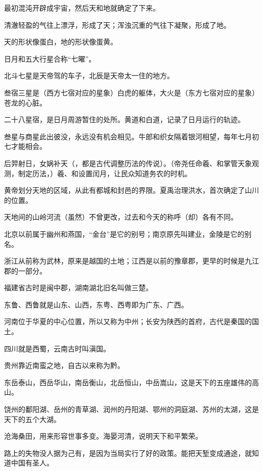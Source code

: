 \documentclass[12pt,UTF-8,openany]{ctexbook}
\begin{document}
\begin{normalsize}
    
    最初混沌开辟成宇宙，然后天和地就确定了下来。
    
    清澈轻盈的气往上漂浮，形成了天；浑浊沉重的气往下凝聚，形成了地。
    
    天的形状像蛋白，地的形状像蛋黄。
    
    日月和五大行星合称“七曜”。
    
    北斗七星是天帝驾的车子，北辰是天帝太一住的地方。
    
    叁宿三星是（西方七宿对应的星象）白虎的躯体，大火是（东方七宿对应的星象）苍龙的心脏。
    
    二十八星宿，是日月周游暂住的处所。黄道和白道，记录了日月运行的轨迹。
    
    叁星与商星此出彼没，永远没有机会相见。牛郎和织女隔着银河相望，每年七月初七才能相会。
    
    后羿射日，女娲补天（，都是古代调整历法的传说）。（帝尧任命羲、和掌管天象观测，制定历法，）羲、和设置闰月，让民众知道务农的时机。
    
    黄帝划分天地的区域，从此有都城和封邑的界限。夏禹治理洪水，首次确定了山川的位置。
    
    天地间的山岭河流（虽然）不曾更改，过去和今天的称呼（却）各有不同。
    
    北京以前属于幽州和燕国，“金台”是它的别号；南京原先叫建业，金陵是它的别名。
    
    浙江从前称为武林，原来是越国的土地；江西是以前的豫章郡，更早的时候是九江郡的一部分。
    
    福建省古时是闽中郡，湖南湖北旧名叫做三楚。
    
    东鲁、西鲁就是山东、山西，东粤、西粤即为广东、广西。
    
    河南位于华夏的中心位置，所以又称为中州；长安为陕西的首府，古代是秦国的国土。
    
    四川就是西蜀，云南古时叫滇国。
    
    贵州靠近南蛮之地，自古以来称为黔。
    
    东岳泰山，西岳华山，南岳衡山，北岳恒山，中岳嵩山，这是天下的五座雄伟的高山。
    
    饶州的鄱阳湖、岳州的青草湖、润州的丹阳湖、鄂州的洞庭湖、苏州的太湖，这是天下的五个大湖。
    
    沧海桑田，用来形容世事多变。海晏河清，说明天下和平繁荣。
    
    路上的失物没人据为己有，是因为当局实行了好的政策。能把天堑变成通途，就知道中国有圣人。
    
\end{normalsize}
\end{document}
